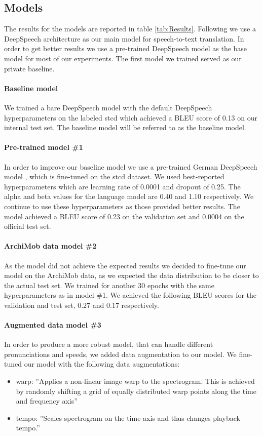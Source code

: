 
\subsection{Models}
The results for the models are reported in table \ref{tab:Results}. 
Following  we use a DeepSpeech architecture \cite{Hannun2014DeepSS} as our main model for speech-to-text translation. In order to get better results we use a
pre-trained DeepSpeech model \cite{DeepSpeechGerman090} as the base model for most of our experiments. The first model we trained served as our private baseline. \paragraph{Baseline model} We trained a bare DeepSpeech model with the default DeepSpeech hyperparameters on the labeled \gls{stcd} which achieved a BLEU score of 0.13 on our internal test set. The baseline model will be referred to as the baseline model.
\paragraph{Pre-trained model \#1} In order to improve our baseline model we use a pre-trained
German DeepSpeech model \cite{DeepSpeechGerman090}, which is fine-tuned on the \gls{stcd} dataset. We used \citet{Agarwal2020LTLUDEAL} best-reported hyperparameters which are learning rate of 0.0001 and dropout of 0.25. The alpha and beta values for the language model are 0.40 and 1.10 respectively. We continue to use these hyperparameters as those provided better results. The model achieved a BLEU score of
0.23 on the validation set and 0.0004 on the official test set.
\paragraph{ArchiMob data model \#2} As the  model did not achieve the expected results we decided to fine-tune our model on the ArchiMob data, as we expected the data distribution to be closer
to the actual test set. We trained for another 30 epochs with the same hyperparameters as in model \#1. We achieved the following BLEU scores for the validation and test set, 0.27 and 0.17 respectively.
\paragraph{Augmented data model \#3} In order to produce a more robust model, that can handle different pronunciations and speeds, we added data augmentation to our  model. We fine-tuned our
model with the following data augmentations:
\begin{itemize}
    \item warp: ''Applies a non-linear image warp to the spectrogram. This is achieved by randomly shifting a grid of equally distributed warp points along the time and frequency axis''
    \cite{DeepSpeechAugmentation}
    \item tempo: ''Scales spectrogram on the time axis and thus changes playback tempo.'' \cite{DeepSpeechAugmentation}
\end{itemize}

